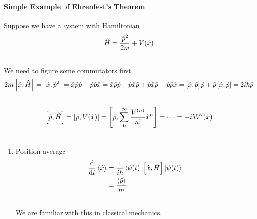 \documentclass[letterpaper,10pt,english]{sphinxmanual}
\def\d{{\rm d}}
\newcommand{\bra}[1]{\left\langle #1\right|}
\newcommand{\ket}[1]{\left| #1\right\rangle}
\begin{document}
\paragraph{Simple Example of Ehrenfest's Theorem}
\label{QuantumMechanics:simple-example-of-ehrenfest-s-theorem}
Suppose we have a system with Hamiltonian
\begin{gather}
\begin{split}\hat H = \frac{\hat p^2}{2m} + V(\hat x)\end{split}\notag\\\begin{split}\end{split}\notag
\end{gather}
We need to figure some commutators first.
\begin{gather}
\begin{split}2m \left[ \hat x, \hat H \right] =\left[\hat x, \hat p^2\right] = \hat x \hat p\hat p - \hat p \hat p \hat x = \hat x \hat p \hat p -\hat p \hat x \hat p + \hat p \hat x \hat p - \hat p \hat p \hat x  = \left[\hat x , \hat p\right]\hat p + \hat p \left[ \hat x,\hat p\right]  = 2 i \hbar \hat p\end{split}\notag\\\begin{split}\end{split}\notag
\end{gather}\begin{gather}
\begin{split}\left[\hat p, \hat H\right] = \left[\hat p, V(\hat x) \right] = \left[\hat p, \sum_0^\infty \frac{V^{(n)}}{n!}\hat x^n\right] =\cdots =-i\hbar V'(\hat x)\end{split}\notag\\\begin{split}\end{split}\notag
\end{gather}\begin{enumerate}
\item {} 
Position average
\begin{gather}
\begin{split}\frac{\d }{\d t} \left< \hat x \right> & =  \frac{1}{i\hbar} \bra{\psi(t)} \left[ \hat x, \hat H \right]\ket{\psi(t)} \\
& =   \frac{\left< \hat p \right>}{m}\end{split}\notag\\\begin{split}\end{split}\notag
\end{gather}
We are familiar with this in classical mechanics.


\end{enumerate}
\end{document}
